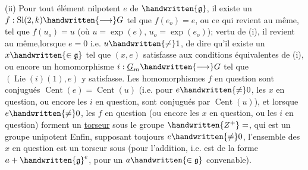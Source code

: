 (ii) Pour tout élément nilpotent $e$ de $\handwritten{\mathfrak{g}}$, il existe un  $f:\operatorname{Sl}(2,k)\handwritten{\longrightarrow}G$ tel que $f(e_o)=e$, ou ce qui revient au même, tel que $f(u_o)=u$ (où $u=\exp(e)$, $u_o=\exp(e_o)$);  vertu de (i), il revient au même,\deleted{\unsure{(}}lorsque $e=0$ i.e. $u\handwritten{\ne}1$, de dire qu'il existe un $x\handwritten{\in\mathfrak{g}}$ tel que $(x,e)$ satisfasse aux conditions équivalentes de (i), ou encore un homomorphisme $i:\underline{G}_m\handwritten{\longrightarrow}G$ tel que $(\operatorname{Lie}(i)(1),e)$ y satisfasse. Les homomorphismes $f$ en question sont conjugués $\operatorname{Cent}(e)=\operatorname{Cent}(u)$ (i.e. pour $e\handwritten{\ne}0$, les $x$ en question, ou encore les $i$ en question, sont conjugués  par $\operatorname{Cent}(u)$), et lorsque $e\handwritten{\ne}0$, les  $f$ en question (ou encore les
$x$ en question, ou les $i$ en question) forment un \uline{torseur} sous le groupe $\handwritten{Z^+}=$, qui est un groupe unipotent
Enfin, supposant toujours $e\handwritten{\ne}0$, l'ensemble des $x$ en question est un torseur sous  (pour l'addition, i.e. est de la forme $a+\handwritten{\mathfrak{g}}^e$, pour un $a\handwritten{\in\mathfrak{g}}$ convenable). 

